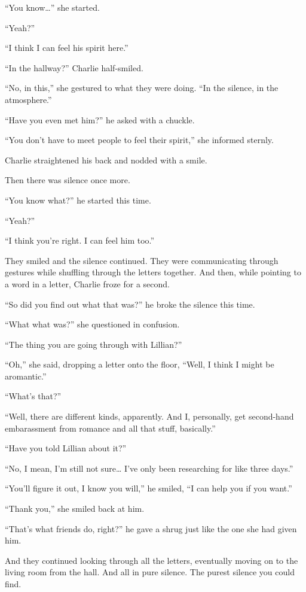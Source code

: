 “You know…” she started.

“Yeah?”

“I think I can feel his spirit here.”

“In the hallway?” Charlie half-smiled.

“No, in this,” she gestured to what they were doing. “In the silence, in the atmosphere.”

“Have you even met him?” he asked with a chuckle.

“You don't have to meet people to feel their spirit,” she informed sternly.

Charlie straightened his back and nodded with a smile.

Then there was silence once more.

“You know what?” he started this time.

“Yeah?”

“I think you're right. I can feel him too.”

They smiled and the silence continued. They were communicating through gestures while shuffling through the letters together. And then, while pointing to a word in a letter, Charlie froze for a second.

“So did you find out what that was?” he broke the silence this time.

“What what was?” she questioned in confusion.

“The thing you are going through with Lillian?”

“Oh,” she said, dropping a letter onto the floor, “Well, I think I might be aromantic.”

“What's that?”

“Well, there are different kinds, apparently. And I, personally, get second-hand embarassment from romance and all that stuff, basically.”

“Have you told Lillian about it?”

“No, I mean, I'm still not sure… I've only been researching for like three days.”

“You'll figure it out, I know you will,” he smiled, “I can help you if you want.”

“Thank you,” she smiled back at him.

“That's what friends do, right?” he gave a shrug just like the one she had given him.

And they continued looking through all the letters, eventually moving on to the living room from the hall. And all in pure silence. The purest silence you could find.